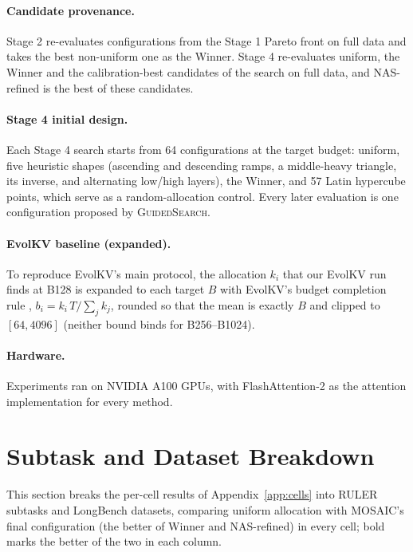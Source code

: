 \paragraph{Candidate provenance.} Stage 2 re-evaluates configurations from the Stage 1 Pareto front on full data and takes the best non-uniform one as the Winner. Stage 4 re-evaluates uniform, the Winner and the calibration-best candidates of the search on full data, and NAS-refined is the best of these candidates.

\paragraph{Stage 4 initial design.} Each Stage 4 search starts from 64 configurations at the target budget: uniform, five heuristic shapes (ascending and descending ramps, a middle-heavy triangle, its inverse, and alternating low/high layers), the Winner, and 57 Latin hypercube points, which serve as a random-allocation control. Every later evaluation is one configuration proposed by \textsc{GuidedSearch}.

\paragraph{EvolKV baseline (expanded).} To reproduce EvolKV's main protocol, the allocation $k_i$ that our EvolKV run finds at B128 is expanded to each target $B$ with EvolKV's budget completion rule \citep{yu2025evolkv}, $b_i = k_i\,T / \sum_j k_j$, rounded so that the mean is exactly $B$ and clipped to $[64, 4096]$ (neither bound binds for B256--B1024).

\paragraph{Hardware.} Experiments ran on NVIDIA A100 GPUs, with FlashAttention-2 as the attention implementation for every method.


\FloatBarrier
\section{Subtask and Dataset Breakdown}
\label{app:breakdown}

This section breaks the per-cell results of Appendix~\ref{app:cells} into RULER subtasks and LongBench datasets, comparing uniform allocation with MOSAIC's final configuration (the better of Winner and NAS-refined) in every cell; bold marks the better of the two in each column.


